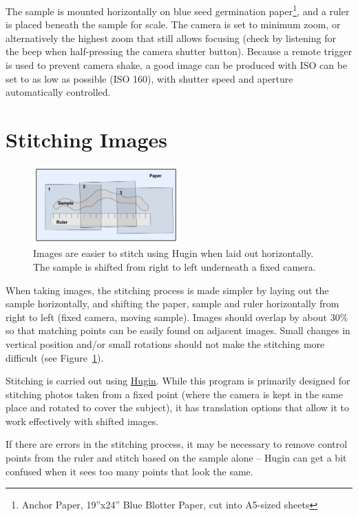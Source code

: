 \documentclass[a4paper]{scrartcl}
\begin{document}
The sample is mounted horizontally on blue seed germination
paper\footnote{Anchor Paper, 19''x24'' Blue Blotter Paper, cut into
  A5-sized sheets}, and a ruler is placed beneath the sample for
scale. The camera is set to minimum zoom, or alternatively the highest
zoom that still allows focusing (check by listening for the beep when
half-pressing the camera shutter button). Because a remote trigger is
used to prevent camera shake, a good image can be produced with ISO
can be set to as low as possible (ISO 160), with shutter speed and
aperture automatically controlled.

\section{Stitching Images}

\begin{figure}
  \centering
  \includegraphics[width=0.5\textwidth]{illustrations/stitching_setup.pdf}
  \caption{Images are easier to stitch using Hugin when laid out
    horizontally. The sample is shifted from right to left underneath
    a fixed camera.}
  \label{fig:stitch-setup}
\end{figure}


When taking images, the stitching process is made simpler by laying
out the sample horizontally, and shifting the paper, sample and ruler
horizontally from right to left (fixed camera, moving sample). Images
should overlap by about 30\% so that matching points can be easily
found on adjacent images. Small changes in vertical position and/or
small rotations should not make the stitching more difficult (see
Figure~\ref{fig:stitch-setup}).

Stitching is carried out using
\href{http://hugin.sourceforge.net/}{Hugin}. While this program is
primarily designed for stitching photos taken from a fixed point
(where the camera is kept in the same place and rotated to cover the
subject), it has translation options that allow it to work effectively
with shifted images.

If there are errors in the stitching process, it may be necessary to
remove control points from the ruler and stitch based on the sample
alone -- Hugin can get a bit confused when it sees too many points
that look the same.
\end{document}
